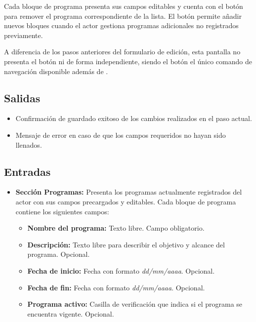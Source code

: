 Cada bloque de programa presenta sus campos editables y cuenta con el botón 
 para remover el programa correspondiente de la lista. El 
botón  permite añadir nuevos bloques cuando el actor 
gestiona programas adicionales no registrados previamente.

A diferencia de los pasos anteriores del formulario de edición, esta pantalla 
no presenta el botón  ni  de 
forma independiente, siendo el botón  el único comando de 
navegación disponible además de .


\subsection{Salidas}
\begin{itemize}
	\item Confirmación de guardado exitoso de los cambios realizados en el paso 
	actual.
	\item Mensaje de error  en 
	caso de que los campos requeridos no hayan sido llenados.
\end{itemize}

\subsection{Entradas}
\begin{itemize}
	\item \textbf{Sección Programas:} Presenta los programas actualmente 
	registrados del actor con sus campos precargados y editables. Cada bloque 
	de programa contiene los siguientes campos:
	\begin{itemize}
		\item \textbf{Nombre del programa:} Texto libre. Campo obligatorio.
		\item \textbf{Descripción:} Texto libre para describir el objetivo y 
		alcance del programa. Opcional.
		\item \textbf{Fecha de inicio:} Fecha con formato \textit{dd/mm/aaaa}. 
		Opcional.
		\item \textbf{Fecha de fin:} Fecha con formato \textit{dd/mm/aaaa}. 
		Opcional.
		\item \textbf{Programa activo:} Casilla de verificación que indica si 
		el programa se encuentra vigente. Opcional.
	\end{itemize}
\end{itemize}

